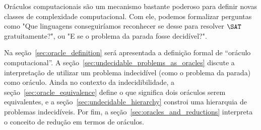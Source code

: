 Oráculos computacionais são um mecanismo bastante poderoso
para definir novas classes de complexidade computacional.
Com ele,
podemos formalizar perguntas como
"Que linguagens conseguiríamos reconhecer
se desse para resolver $\SAT$ gratuitamente?",
ou "E se o problema da parada fosse decidível?".

Na seção~\ref{sec:oracle_definition} será apresentada a definição formal
de ``oráculo computacional''.
A seção~\ref{sec:undecidable_problems_as_oracles}
discute a interpretação de utilizar um problema indecidível
(como o problema da parada)
como oráculo.
Ainda no contexto da indecidibilidade,
a seção~\ref{sec:oracle_equivalence} define o que significa
dois oráculos serem equivalentes,
e a seção~\ref{sec:undecidable_hierarchy}
constroi uma hierarquia de problemas indecidíveis.
Por fim,
a seção~\ref{sec:oracles_and_reductions}
interpreta o conceito de redução em termos de oráculos.
